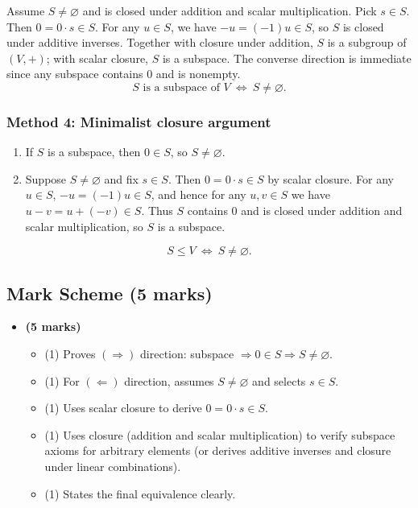 \documentclass[12pt]{article}
\begin{document}
Assume $S\neq\varnothing$ and is closed under addition and scalar multiplication.
Pick $s\in S$. Then $0=0\cdot s\in S$.
For any $u\in S$, we have $-u=(-1)u\in S$, so $S$ is closed under additive inverses.
Together with closure under addition, $S$ is a subgroup of $(V,+)$; with scalar closure, $S$ is a subspace.
The converse direction is immediate since any subspace contains $0$ and is nonempty.
\[
\boxed{\,S\text{ is a subspace of }V\ \Longleftrightarrow\ S\neq\varnothing.\,}
\]

\subsubsection{Method 4: Minimalist closure argument}
\begin{enumerate}[label=(\roman*)]
\item[$(\Rightarrow)$] If $S$ is a subspace, then $0\in S$, so $S\neq\varnothing$.
\item[$(\Leftarrow)$] Suppose $S\neq\varnothing$ and fix $s\in S$.
Then $0=0\cdot s\in S$ by scalar closure.
For any $u\in S$, $-u=(-1)u\in S$, and hence for any $u,v\in S$ we have $u-v=u+(-v)\in S$.
Thus $S$ contains $0$ and is closed under addition and scalar multiplication, so $S$ is a subspace.
\end{enumerate}
\[
\boxed{\,S\le V\ \Longleftrightarrow\ S\neq\varnothing.\,}
\]

\subsection{Mark Scheme (5 marks)}
\begin{itemize}[leftmargin=1.6em]
  \item \textbf{(5 marks)}
  \begin{itemize}[leftmargin=1.6em]
    \item (1) Proves $(\Rightarrow)$ direction: subspace $\Rightarrow 0\in S \Rightarrow S\neq\varnothing$.
    \item (1) For $(\Leftarrow)$ direction, assumes $S\neq\varnothing$ and selects $s\in S$.
    \item (1) Uses scalar closure to derive $0=0\cdot s\in S$.
    \item (1) Uses closure (addition and scalar multiplication) to verify subspace axioms for arbitrary elements (or derives additive inverses and closure under linear combinations).
    \item (1) States the final equivalence clearly.
  \end{itemize}
\end{itemize}
\end{document}
